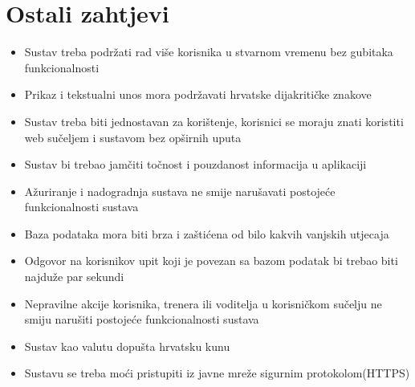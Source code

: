 				
				
				\eject
	            
	            
	            
		\section{Ostali zahtjevi}
		
			\begin{itemize}
	        	\item 	Sustav treba podržati rad više korisnika u stvarnom vremenu bez gubitaka funkcionalnosti
	        	\item 	Prikaz i tekstualni unos mora podržavati hrvatske dijakritičke znakove
	        	\item 	Sustav treba biti jednostavan za korištenje, korisnici se moraju znati koristiti web sučeljem i sustavom bez opširnih uputa 
	        	\item 	Sustav bi trebao jamčiti točnost i pouzdanost informacija u aplikaciji
	        	\item 	Ažuriranje i nadogradnja sustava ne smije narušavati postojeće funkcionalnosti sustava
	        	\item 	Baza podataka mora biti brza i zaštićena od bilo kakvih vanjskih utjecaja
	        	\item 	Odgovor na korisnikov upit koji je povezan sa bazom podatak bi trebao biti najduže par sekundi
	        	\item 	Nepravilne akcije korisnika, trenera ili voditelja u korisničkom sučelju ne smiju narušiti postojeće funkcionalnosti sustava
	        	\item 	Sustav kao valutu dopušta hrvatsku kunu
	        	\item 	Sustavu se treba moći pristupiti iz javne mreže sigurnim protokolom(HTTPS)
        	\end{itemize}
			 
			 
			 
	